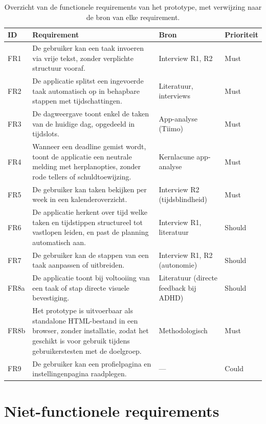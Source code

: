 \begin{table}[h]
\centering
\begin{tabular}{|p{1.5cm}|p{9.5cm}|p{2cm}|p{2cm}|}
\hline
\textbf{ID} & \textbf{Requirement} & \textbf{Bron} & \textbf{Prioriteit} \\
\hline
FR1 & De gebruiker kan een taak invoeren via vrije tekst, zonder verplichte
structuur vooraf. & Interview R1, R2 & Must \\
\hline
FR2 & De applicatie splitst een ingevoerde taak automatisch op in behapbare
stappen met tijdschattingen. & Literatuur, interviews & Must \\
\hline
FR3 & De dagweergave toont enkel de taken van de huidige dag, opgedeeld in
tijdslots. & App-analyse (Tiimo) & Must \\
\hline
FR4 & Wanneer een deadline gemist wordt, toont de applicatie een neutrale
melding met herplanopties, zonder rode tellers of schuldtoewijzing. &
Kernlacune app-analyse & Must \\
\hline
FR5 & De gebruiker kan taken bekijken per week in een kalenderoverzicht. &
Interview R2 (tijdsblindheid) & Must \\
\hline
FR6 & De applicatie herkent over tijd welke taken en tijdstippen structureel
tot vastlopen leiden, en past de planning automatisch aan. & Interview R1,
literatuur & Should \\
\hline
FR7 & De gebruiker kan de stappen van een taak aanpassen of uitbreiden. &
Interview R1, R2 (autonomie) & Should \\
\hline
FR8a & De applicatie toont bij voltooiing van een taak of stap directe visuele
bevestiging. & Literatuur (directe feedback bij ADHD) & Should \\
\hline
FR8b & Het prototype is uitvoerbaar als standalone HTML-bestand in een browser,
zonder installatie, zodat het geschikt is voor gebruik tijdens gebruikerstesten
met de doelgroep. & Methodologisch & Must \\
\hline
FR9 & De gebruiker kan een profielpagina en instellingenpagina raadplegen. &
— & Could \\
\hline
\end{tabular}
\caption[Functionele requirements]{Overzicht van de functionele requirements
van het prototype, met verwijzing naar de bron van elke requirement.}
\label{tab:functionele-requirements}
\end{table}

\section{Niet-functionele requirements}


